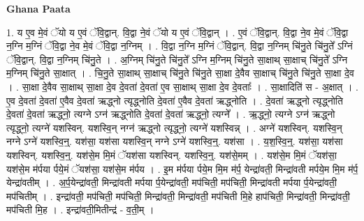 \documentclass[17pt]{extarticle}
\begin{document}
\textbf{Ghana Paata } \newline

1. य ए॒व मे॒वं ॅयो य ए॒वं ॅवि॒द्वान्. वि॒द्वा ने॒वं ॅयो य ए॒वं ॅवि॒द्वान् । . ए॒वं ॅवि॒द्वान्. वि॒द्वा ने॒व मे॒वं ॅवि॒द्वा न॒ग्नि म॒ग्निं ॅवि॒द्वा ने॒व मे॒वं ॅवि॒द्वा न॒ग्निम् । . वि॒द्वा न॒ग्नि म॒ग्निं ॅवि॒द्वान्. वि॒द्वा न॒ग्निम् चि॑नु॒ते चि॑नु॒ते᳚ ऽग्निं ॅवि॒द्वान्. वि॒द्वा न॒ग्निम् चि॑नु॒ते । . अ॒ग्निम् चि॑नु॒ते चि॑नु॒ते᳚ ऽग्नि म॒ग्निम् चि॑नु॒ते सा॒क्षाथ् सा॒क्षाच् चि॑नु॒ते᳚ ऽग्नि म॒ग्निम् चि॑नु॒ते सा॒क्षात् । . चि॒नु॒ते सा॒क्षाथ् सा॒क्षाच् चि॑नु॒ते चि॑नु॒ते सा॒क्षा दे॒वैव सा॒क्षाच् चि॑नु॒ते चि॑नु॒ते सा॒क्षा दे॒व । . सा॒क्षा दे॒वैव सा॒क्षाथ् सा॒क्षा दे॒व दे॒वता॑ दे॒वता॑ ए॒व सा॒क्षाथ् सा॒क्षा दे॒व दे॒वताः᳚ । . सा॒क्षादिति॑ स - अ॒क्षात् । . ए॒व दे॒वता॑ दे॒वता॑ ए॒वैव दे॒वता॑ ऋद्ध्नो त्यृद्ध्नोति दे॒वता॑ ए॒वैव दे॒वता॑ ऋद्ध्नोति । . दे॒वता॑ ऋद्ध्नो त्यृद्ध्नोति दे॒वता॑ दे॒वता॑ ऋद्ध्नो॒ त्यग्ने ऽग्न॑ ऋद्ध्नोति दे॒वता॑ दे॒वता॑ ऋद्ध्नो॒ त्यग्ने᳚ । . ऋ॒द्ध्नो॒ त्यग्ने ऽग्न॑ ऋद्ध्नो त्यृद्ध्नो॒ त्यग्ने॑ यशस्विन्. यशस्वि॒न् नग्न॑ ऋद्ध्नो त्यृद्ध्नो॒ त्यग्ने॑ यशस्विन्न् । . अग्ने॑ यशस्विन्. यशस्वि॒न् नग्ने ऽग्ने॑ यशस्वि॒न्॒. यश॑सा॒ यश॑सा यशस्वि॒न् नग्ने ऽग्ने॑ यशस्वि॒न्॒. यश॑सा । . य॒श॒स्वि॒न्॒. यश॑सा॒ यश॑सा यशस्विन्. यशस्वि॒न्॒. यश॑से॒म मि॒मं ॅयश॑सा यशस्विन्. यशस्वि॒न्॒. यश॑से॒मम् । . यश॑से॒म मि॒मं ॅयश॑सा॒ यश॑से॒म म॑र्पया र्पये॒मं ॅयश॑सा॒ यश॑से॒म म॑र्पय । . इ॒म म॑र्पया र्पये॒म मि॒म म॑र्प॒ येन्द्रा॑वती॒ मिन्द्रा॑वती मर्पये॒म मि॒म म॑र्प॒ येन्द्रा॑वतीम् । . अ॒र्प॒येन्द्रा॑वती॒ मिन्द्रा॑वती मर्पया र्प॒येन्द्रा॑वती॒ मप॑चिती॒ मप॑चिती॒ मिन्द्रा॑वती मर्पया र्प॒येन्द्रा॑वती॒ मप॑चितीम् । . इन्द्रा॑वती॒ मप॑चिती॒ मप॑चिती॒ मिन्द्रा॑वती॒ मिन्द्रा॑वती॒ मप॑चिती मि॒हे हाप॑चिती॒ मिन्द्रा॑वती॒ मिन्द्रा॑वती॒ मप॑चिती मि॒ह । . इन्द्रा॑वती॒मितीन्द्र॑ - व॒ती॒म् । \newline
\end{document}
